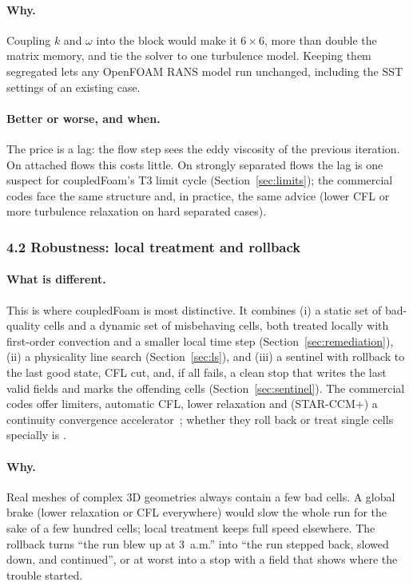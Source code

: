 \paragraph{Why.} Coupling $k$ and $\omega$ into the block would make it
$6\times6$, more than double the matrix memory, and tie the solver to one
turbulence model. Keeping them segregated lets any OpenFOAM RANS model run
unchanged, including the SST settings of an existing case.

\paragraph{Better or worse, and when.} The price is a lag: the flow step
sees the eddy viscosity of the previous iteration. On attached flows this
costs little. On strongly separated flows the lag is one suspect for
coupledFoam's T3 limit cycle (Section~\ref{sec:limits}); the commercial
codes face the same structure and, in practice, the same advice (lower
CFL or more turbulence relaxation on hard separated cases).

\subsubsection*{4.2 Robustness: local treatment and rollback}

\paragraph{What is different.} This is where coupledFoam is most
distinctive. It combines
(i) a static set of bad-quality cells and a dynamic set of misbehaving
cells, both treated locally with first-order convection and a smaller
local time step (Section~\ref{sec:remediation}),
(ii) a physicality line search (Section~\ref{sec:ls}), and
(iii) a sentinel with rollback to the last good state, CFL cut, and, if
all fails, a clean stop that writes the last valid fields and marks the
offending cells (Section~\ref{sec:sentinel}). The commercial codes offer
limiters, automatic CFL, lower relaxation and (STAR-CCM+) a continuity
convergence accelerator~\cite{cmp-VolupeCoupled,cmp-Caraeni2013}; whether
they roll back or treat single cells specially is \cmpnpd.

\paragraph{Why.} Real  meshes of complex 3D geometries
always contain a few bad cells. A global brake (lower relaxation or CFL everywhere) would
slow the whole run for the sake of a few hundred cells; local treatment
keeps full speed elsewhere. The rollback turns ``the run blew up at
3~a.m.'' into ``the run stepped back, slowed down, and continued'', or at
worst into a stop with a field that shows where the trouble started.


